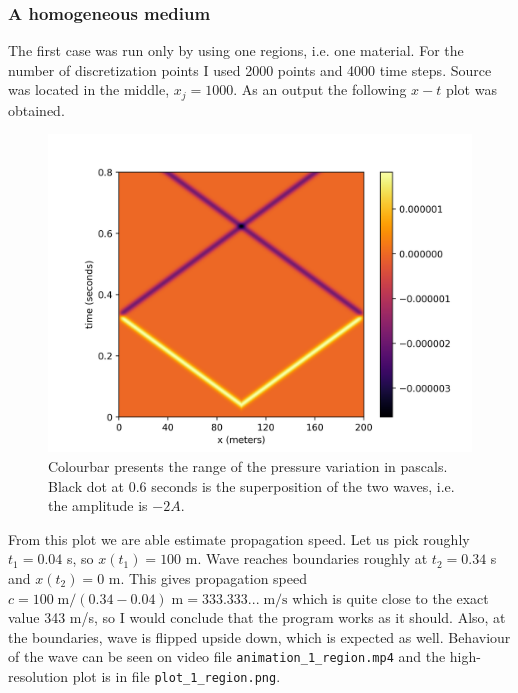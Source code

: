 \documentclass[]{article}
\begin{document}
\subsubsection{A homogeneous medium}
The first case was run only by using one regions, i.e. one material. For the number of discretization points I used 2000 points and 4000 time steps. Source was located in the middle, $x_j=1000$. As an output the following $x-t$ plot was obtained. \newpage

\begin{figure}[h!]
	\centering
	\includegraphics[width=1.0\linewidth]{media/plot_1_region}
	\caption{Colourbar presents the range of the pressure variation in pascals. Black dot at 0.6 seconds is the superposition of the two waves, i.e. the amplitude is $-2A$.}
	\label{fig:plot1region}
\end{figure}

From this plot we are able estimate propagation speed. Let us pick roughly $t_1=0.04$ s, so $x(t_1)=100$ m. Wave reaches boundaries roughly at $t_2=0.34$ s and $x(t_2)=0$ m. This gives propagation speed $c=100\;\textrm{m}/(0.34-0.04)\;\textrm{m}=333.333...\;\textrm{m/s}$ which is quite close to the exact value 343 m/s, so I would conclude that the program works as it should. Also, at the boundaries, wave is flipped upside down, which is expected as well. Behaviour of the wave can be seen on video file \texttt{animation\_1\_region.mp4} and the high-resolution plot is in file \texttt{plot\_1\_region.png}.
 
\end{document}
